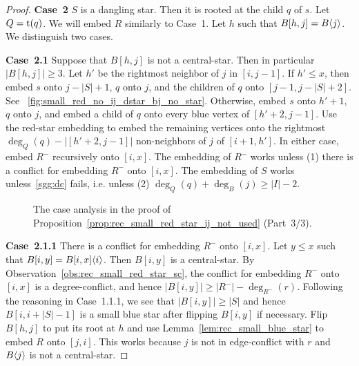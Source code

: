 \documentclass[11pt,a4paper,colorlinks=true,urlcolor=blue,citecolor=red]{article}
\theoremstyle{plain}
\newcommand{\case}[1]{\par\vspace{.5\baselineskip}\noindent\textbf{\sffamily Case~#1}}
\begin{document}
\begin{proof}
  \case{2} $S$ is a dangling star. Then it is rooted at the child $q$ of
  $s$. Let $Q=\mathrm t(q)$. We will embed $R$ similarly to Case~1. Let $h$
  such that $B[h,j]=B\langle{j}\rangle$. We distinguish two cases.

  \case{2.1} Suppose that $B[h,j]$ is not a central-star. Then in
  particular $|B[h,j]|\geq 3$. Let $h'$ be the rightmost neighbor of $j$
  in $[i,j-1]$. If $h'\leq x$, then embed $s$ onto $j-|S|+1$, $q$ onto
  $j$, and the children of $q$ onto $[j-1,j-|S|+2]$. See
  \figurename~\ref{fig:small_red_no_ij_dstar_bj_no_star}. Otherwise,
  embed $s$ onto $h'+1$, $q$ onto $j$, and embed a child of $q$ onto
  every blue vertex of $[h'+2,j-1]$. Use the red-star embedding
  to embed the remaining vertices onto the rightmost
  $\deg_Q(q)-|[h'+2,j-1]|$ non-neighbors of $j$ of $[i+1,h']$. In either
  case, embed $R^-$ recursively onto $[i,x]$. The embedding of $R^-$
  works unless (1) there is a conflict for embedding $R^-$ onto
  $[i,x]$. The embedding of $S$ works unless~\ref{sgg:dc} fails,
  i.e. unless (2) $\deg_Q(q)+\deg_B(j)\geq|I|-2$.

  \begin{figure}[b]
    \centering\hfil {}\hfil {}\hfil {}\hfil {}\hfil \label{fig:small_red_no_ij_2}
    \caption{The case analysis in the proof of
      Proposition~\ref{prop:rec_small_red_star_ij_not_used} (Part~3/3).}
  \end{figure}


  \case{2.1.1} There is a conflict for embedding $R^-$ onto $[i,x]$. Let
  $y\leq x$ such that $B[i,y]=B{[i,x]}\langle{i}\rangle$. Then $B[i,y]$ is a
  central-star. By Observation~\ref{obs:rec_small_red_star_sc}, the
  conflict for embedding $R^-$ onto $[i,x]$ is a degree-conflict, and
  hence $|B[i,y]|\geq|R^-|-\deg_{R^-}(r)$. Following the reasoning in
  Case~1.1.1, we see that $|B[i,y]|\geq|S|$ and hence $B[i,i+|S|-1]$ is
  a small blue star after flipping $B[i,y]$ if necessary. Flip $B[h,j]$
  to put its root at $h$ and use Lemma~\ref{lem:rec_small_blue_star} to
  embed $R$ onto $[j,i]$. This works because $j$ is not in edge-conflict
  with $r$ and $B\langle{j}\rangle$ is not a central-star.


\end{proof}
\end{document}
